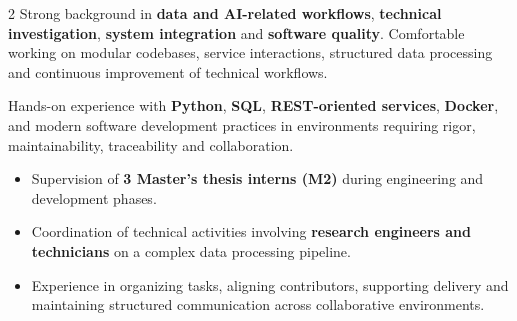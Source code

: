 \documentclass[8pt,a4paper,ragged2e,withhyper]{../_shared/altacv}
\begin{document}
\begin{paracol}{2}
Strong background in \textbf{data and AI-related workflows}, \textbf{technical investigation}, \textbf{system integration} and \textbf{software quality}. Comfortable working on modular codebases, service interactions, structured data processing and continuous improvement of technical workflows.

Hands-on experience with \textbf{Python}, \textbf{SQL}, \textbf{REST-oriented services}, \textbf{Docker}, and modern software development practices in environments requiring rigor, maintainability, traceability and collaboration.


\begin{itemize}
  \item Supervision of \textbf{3 Master’s thesis interns (M2)} during engineering and development phases.
  \item Coordination of technical activities involving \textbf{research engineers and technicians} on a complex data processing pipeline.
  \item Experience in organizing tasks, aligning contributors, supporting delivery and maintaining structured communication across collaborative environments.
\end{itemize}

{}
\divider

\divider


\medskip

\divider



\divider
{}
\divider
{}



\end{paracol}
\end{document}
